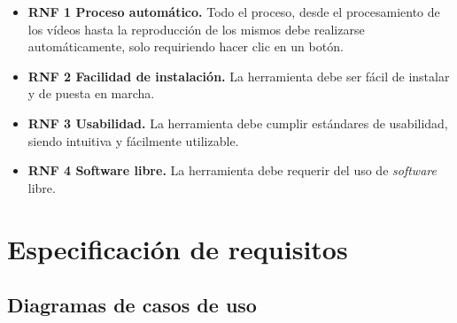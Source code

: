 \begin{itemize}

\item \textbf{RNF 1 Proceso automático.}  Todo el proceso, desde el procesamiento de los vídeos hasta la reproducción de los mismos debe realizarse automáticamente, solo requiriendo hacer clic en un botón.

\item \textbf{RNF 2 Facilidad de instalación.} La herramienta debe ser fácil de instalar y de puesta en marcha.

\item \textbf{RNF 3 Usabilidad.} La herramienta debe cumplir estándares de usabilidad, siendo intuitiva y fácilmente utilizable.

\item \textbf{RNF 4 Software libre.} La herramienta debe requerir del uso de \emph{software} libre.

\end{itemize}

\section{Especificación de requisitos}

\subsection{Diagramas de casos de uso}



